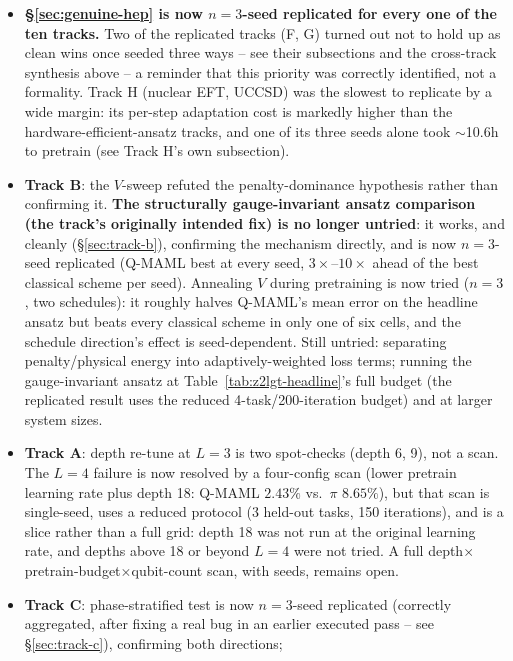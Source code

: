 \documentclass[11pt]{article}
\begin{document}
\begin{itemize}[nosep]
    \item \textbf{\S\ref{sec:genuine-hep} is now $n{=}3$-seed replicated for every one of the ten tracks.}
    Two of the replicated tracks (F, G) turned out not to hold up as clean wins once seeded three ways --
    see their subsections and the cross-track synthesis above -- a reminder that this priority was
    correctly identified, not a formality. Track H (nuclear EFT, UCCSD) was the slowest to replicate by a
    wide margin: its per-step adaptation cost is markedly higher than the hardware-efficient-ansatz tracks,
    and one of its three seeds alone took $\sim$10.6h to pretrain (see Track H's own subsection).
    \item \textbf{Track B}: the $V$-sweep refuted the penalty-dominance hypothesis rather than confirming
    it. \textbf{The structurally gauge-invariant ansatz comparison (the track's originally intended fix) is
    no longer untried}: it works, and cleanly (\S\ref{sec:track-b}), confirming the mechanism directly, and
    is now $n{=}3$-seed replicated (Q-MAML best at every seed, $3\times$--$10\times$ ahead of the best
    classical scheme per seed). Annealing $V$ during pretraining is now tried ($n{=}3$, two schedules): it
    roughly halves Q-MAML's mean error on the headline ansatz but beats every classical scheme in only one of
    six cells, and the schedule direction's effect is seed-dependent. Still untried: separating
    penalty/physical energy into adaptively-weighted loss terms; running the gauge-invariant ansatz at
    Table~\ref{tab:z2lgt-headline}'s full budget (the replicated result uses the reduced 4-task/200-iteration
    budget) and at larger system sizes.
    \item \textbf{Track A}: depth re-tune at $L{=}3$ is two spot-checks (depth 6, 9), not a scan. The
    $L{=}4$ failure is now resolved by a four-config scan (lower pretrain learning rate plus depth 18:
    Q-MAML $2.43\%$ vs.\ $\pi$ $8.65\%$), but that scan is single-seed, uses a reduced protocol (3
    held-out tasks, 150 iterations), and is a slice rather than a full grid: depth 18 was not run at the
    original learning rate, and depths above 18 or beyond $L{=}4$ were not tried. A full
    depth$\times$pretrain-budget$\times$qubit-count scan, with seeds, remains open.
    \item \textbf{Track C}: phase-stratified test is now $n{=}3$-seed replicated (correctly aggregated, after
    fixing a real bug in an earlier executed pass -- see \S\ref{sec:track-c}), confirming both directions;

\end{itemize}
\end{document}
